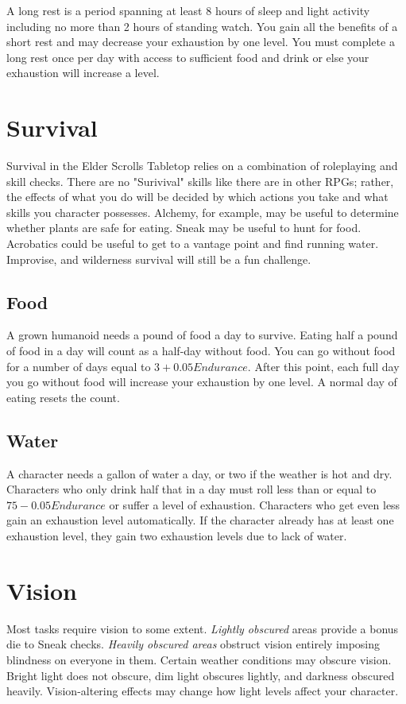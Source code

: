\documentclass[12pt]{book}
\begin{document}
A long rest is a period spanning at least 8 hours of sleep and light activity including no more than 2 hours of standing watch. You gain all the benefits of a short rest and may decrease your exhaustion by one level. You must complete a long rest once per day with access to sufficient food and drink or else your exhaustion will increase a level.

\section{Survival}
Survival in the Elder Scrolls Tabletop relies on a combination of roleplaying and skill checks. There are no "Surivival" skills like there are in other RPGs; rather, the effects of what you do will be decided by which actions you take and what skills you character possesses. Alchemy, for example, may be useful to determine whether plants are safe for eating. Sneak may be useful to hunt for food. Acrobatics could be useful to get to a vantage point and find running water. Improvise, and wilderness survival will still be a fun challenge.

\subsection{Food}
A grown humanoid needs a pound of food a day to survive. Eating half a pound of food in a day will count as a half-day without food. You can go without food for a number of days equal to $3+0.05Endurance$. After this point, each full day you go without food will increase your exhaustion by one level. A normal day of eating resets the count.

\subsection{Water}
A character needs a gallon of water a day, or two if the weather is hot and dry. Characters who only drink half that in a day must roll less than or equal to $75-0.05Endurance$ or suffer a level of exhaustion. Characters who get even less gain an exhaustion level automatically. If the character already has at least one exhaustion level, they gain two exhaustion levels due to lack of water.

\section{Vision}
Most tasks require vision to some extent. \textit{Lightly obscured} areas provide a bonus die to Sneak checks. \textit{Heavily obscured areas} obstruct vision entirely imposing blindness on everyone in them. Certain weather conditions may obscure vision. Bright light does not obscure, dim light obscures lightly, and darkness obscured heavily. Vision-altering effects may change how light levels affect your character.
\end{document}
